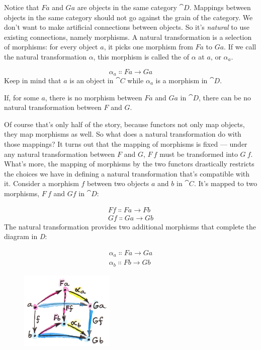 \noindent
Notice that $F a$ and $G a$ are objects in the same
category $\cat{D}$. Mappings between objects in the same category should
not go against the grain of the category. We don't want to make
artificial connections between objects. So it's \emph{natural} to use
existing connections, namely morphisms. A natural transformation is a
selection of morphisms: for every object $a$, it picks one
morphism from $F a$ to $G a$. If we call the natural
transformation $\alpha$, this morphism is called the 
of $\alpha$ at $a$, or $\alpha_a$.

\[\alpha_a \Colon F a \to G a\]
Keep in mind that $a$ is an object in $\cat{C}$ while $\alpha_a$
is a morphism in $\cat{D}$.

If, for some $a$, there is no morphism between $F a$ and
$G a$ in $\cat{D}$, there can be no natural transformation
between $F$ and $G$.

Of course that's only half of the story, because functors not only map
objects, they map morphisms as well. So what does a natural
transformation do with those mappings? It turns out that the mapping of
morphisms is fixed --- under any natural transformation between $F$ and $G$,
$F\ f$ must be transformed into $G\ f$. What's more, the
mapping of morphisms by the two functors drastically restricts the
choices we have in defining a natural transformation that's compatible
with it. Consider a morphism $f$ between two objects $a$
and $b$ in $\cat{C}$. It's mapped to two morphisms, $F\ f$
and $G f$ in $\cat{D}$:

\begin{gather*}
F f \Colon F a \to F b \\
G f \Colon G a \to G b
\end{gather*}
The natural transformation  provides two additional morphisms
that complete the diagram in \emph{D}:

\begin{gather*}
\alpha_a \Colon F a \to G a \\
\alpha_b \Colon F b \to G b
\end{gather*}

\begin{figure}[H]
\centering
\includegraphics[width=0.4\textwidth]{images/3_naturality.jpg}
\end{figure}


